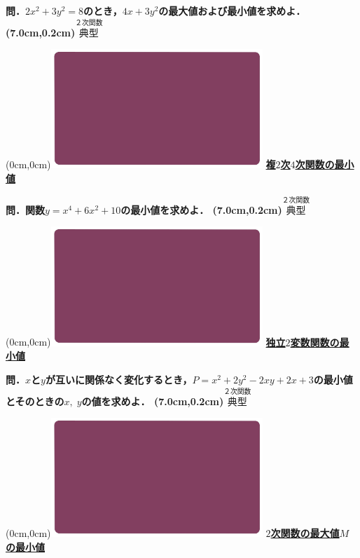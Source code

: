 \documentclass[10pt,
fleqn,
dvipdfmx,
uplatex
]{jsarticle}
\begin{document}
\LARGE 
\bf\boldmath 問．$2x^2+3y^2=8$のとき，$4x+3y^2$の最大値および最小値を求めよ．
\at(7.0cm,0.2cm){\small\color{bradorange}$\overset{\text{２次関数}}{\text{典型}}$}


\newpage



\at(0cm,0cm){\includegraphics[width=8cm,bb=0 0 1920 1080]{./youtube/thumbnails/templates/smart_background/２次関数.jpeg}}
{\color{orange}\bf\boldmath\LARGE\underline{複$2$次$4$次関数の最小値}}\vspace{0.3zw}

\huge 
\bf\boldmath 問．関数$y=x^4+6x^2+{10}$の最小値を求めよ．
\at(7.0cm,0.2cm){\small\color{bradorange}$\overset{\text{２次関数}}{\text{典型}}$}


\newpage



\at(0cm,0cm){\includegraphics[width=8cm,bb=0 0 1920 1080]{./youtube/thumbnails/templates/smart_background/２次関数.jpeg}}
{\color{orange}\bf\boldmath\LARGE\underline{独立$2$変数関数の最小値}}\vspace{0.3zw}

\LARGE 
\bf\boldmath 問．$x$と$y$が互いに関係なく変化するとき，$P=x^2+2y^2-2xy+2x+3$の最小値とそのときの$x,\;y$の値を求めよ．
\at(7.0cm,0.2cm){\small\color{bradorange}$\overset{\text{２次関数}}{\text{典型}}$}


\newpage



\at(0cm,0cm){\includegraphics[width=8cm,bb=0 0 1920 1080]{./youtube/thumbnails/templates/smart_background/２次関数.jpeg}}
{\color{orange}\bf\boldmath\Large\underline{$2$次関数の最大値$M$の最小値}}\vspace{0.3zw}
\end{document}
